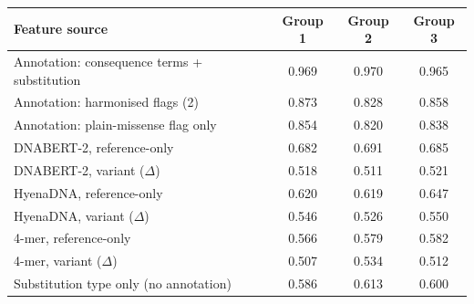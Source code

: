 \begin{tabular}{lccc}\toprule
Feature source & Group 1 & Group 2 & Group 3\\\midrule
Annotation: consequence terms + substitution & 0.969 & 0.970 & 0.965\\
Annotation: harmonised flags (2) & 0.873 & 0.828 & 0.858\\
Annotation: plain-missense flag only & 0.854 & 0.820 & 0.838\\
DNABERT-2, reference-only & 0.682 & 0.691 & 0.685\\
DNABERT-2, variant ($\Delta$) & 0.518 & 0.511 & 0.521\\
HyenaDNA, reference-only & 0.620 & 0.619 & 0.647\\
HyenaDNA, variant ($\Delta$) & 0.546 & 0.526 & 0.550\\
4-mer, reference-only & 0.566 & 0.579 & 0.582\\
4-mer, variant ($\Delta$) & 0.507 & 0.534 & 0.512\\
Substitution type only (no annotation) & 0.586 & 0.613 & 0.600\\
\bottomrule\end{tabular}
